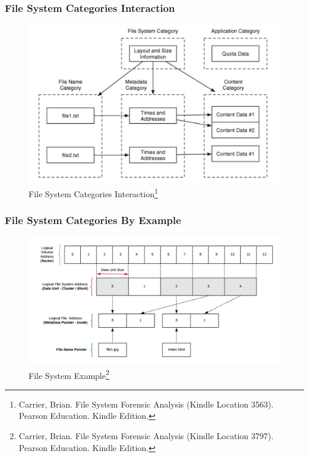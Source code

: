 \documentclass{beamer}
\begin{document}
\begin{frame}
	\frametitle{File System Categories Interaction}
	\begin{figure}[h]
		\includegraphics[scale=0.36]{fs-category-interaction-briancarrier}
		\caption{File System Categories Interaction\footnote{\tiny Carrier, Brian. File System Forensic Analysis (Kindle Location 3563). Pearson Education. Kindle Edition. }}
		\label{fig:fs-category-interaction}
	\end{figure}
\end{frame}

\begin{frame}
	\frametitle{File System Categories By Example}
	\begin{figure}[h]
		\includegraphics[scale=0.61]{file-system-example}
		\caption{File System Example\footnote{\tiny Carrier, Brian. File System Forensic Analysis (Kindle Location 3797). Pearson Education. Kindle Edition. }}
		\label{fig:fs-example}
	\end{figure}
\end{frame}
\end{document}
